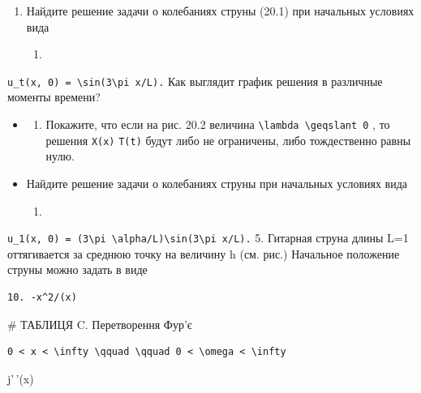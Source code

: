 \documentclass[
  ukrainian,
]{article}
\providecommand{\tightlist}{%
  \setlength{\itemsep}{0pt}\setlength{\parskip}{0pt}}
\begin{document}
\begin{enumerate}
\def\labelenumi{\arabic{enumi}.}
\setcounter{enumi}{1}
\item
  Найдите решение задачи о колебаниях струны (20.1) при начальных
  условиях вида

  \begin{enumerate}
  \def\labelenumii{\arabic{enumii}.}
  \setcounter{enumii}{7}
  \item
  \end{enumerate}
\end{enumerate}

\texttt{u\_t(x,\ 0)\ =\ \textbackslash{}sin(3\textbackslash{}pi\ x/L).}
Как выглядит график решения в различные моменты времени?

\begin{itemize}
\item
  \begin{enumerate}
  \def\labelenumi{\arabic{enumi}.}
  \setcounter{enumi}{2}
  \tightlist
  \item
    Покажите, что если на рис. 20.2 величина
    \texttt{\textbackslash{}lambda\ \textbackslash{}geqslant\ 0} , то
    решения \texttt{X(x)} \texttt{T(t)} будут либо не ограничены, либо
    тождественно равны нулю.
  \end{enumerate}
\item
  Найдите решение задачи о колебаниях струны при начальных условиях вида

  \begin{enumerate}
  \def\labelenumi{\arabic{enumi}.}
  \setcounter{enumi}{8}
  \item
    \arctan {}
  \end{enumerate}
\end{itemize}

\texttt{u\_1(x,\ 0)\ =\ (3\textbackslash{}pi\ \textbackslash{}alpha/L)\textbackslash{}sin(3\textbackslash{}pi\ x/L).}
5. Гитарная струна длины L=1 оттягивается за среднюю точку на величину h
(см. рис.) Начальное положение струны можно задать в виде

\begin{verbatim}
10. -x^2/(x)
\end{verbatim}

\# ТАБЛИЦЯ C. Перетворення Фур'є

\begin{verbatim}
0 < x < \infty \qquad \qquad 0 < \omega < \infty
\end{verbatim}

j'\,'(x)
\end{document}
